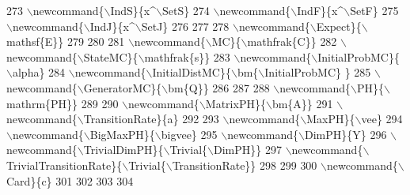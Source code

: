 \begin{DoxyCode}
{}
273 \textcolor{stringliteral}{\(\backslash\)newcommand\{\(\backslash\)IndS\}\{x^\(\backslash\)SetS\}
}
274 \textcolor{stringliteral}{\(\backslash\)newcommand\{\(\backslash\)IndF\}\{x^\(\backslash\)SetF\}
}
275 \textcolor{stringliteral}{\(\backslash\)newcommand\{\(\backslash\)IndJ\}\{x^\(\backslash\)SetJ\}
}
276 \textcolor{stringliteral}{}
277 \textcolor{stringliteral}{%
}
278 \textcolor{stringliteral}{\(\backslash\)newcommand\{\(\backslash\)Expect\}\{\(\backslash\)mathsf\{E\}\}
}
279 \textcolor{stringliteral}{}
280 \textcolor{stringliteral}{%
}
281 \textcolor{stringliteral}{\(\backslash\)newcommand\{\(\backslash\)MC\}\{\(\backslash\)mathfrak\{C\}\}
}
282 \textcolor{stringliteral}{\(\backslash\)newcommand\{\(\backslash\)StateMC\}\{\(\backslash\)mathfrak\{s\}\}
}
283 \textcolor{stringliteral}{\(\backslash\)newcommand\{\(\backslash\)InitialProbMC\}\{\(\backslash\)alpha\}
}
284 \textcolor{stringliteral}{\(\backslash\)newcommand\{\(\backslash\)InitialDistMC\}\{\(\backslash\)bm\{\(\backslash\)InitialProbMC\} \}
}
285 \textcolor{stringliteral}{\(\backslash\)newcommand\{\(\backslash\)GeneratorMC\}\{\(\backslash\)bm\{Q\}\}
}
286 \textcolor{stringliteral}{}
287 \textcolor{stringliteral}{%
}
288 \textcolor{stringliteral}{\(\backslash\)newcommand\{\(\backslash\)PH\}\{\(\backslash\)mathrm\{PH\}\}
}
289 \textcolor{stringliteral}{%
}
290 \textcolor{stringliteral}{\(\backslash\)newcommand\{\(\backslash\)MatrixPH\}\{\(\backslash\)bm\{A\}\}
}
291 \textcolor{stringliteral}{\(\backslash\)newcommand\{\(\backslash\)TransitionRate\}\{a\}
}
292 \textcolor{stringliteral}{%
}
293 \textcolor{stringliteral}{\(\backslash\)newcommand\{\(\backslash\)MaxPH\}\{\(\backslash\)vee\}
}
294 \textcolor{stringliteral}{\(\backslash\)newcommand\{\(\backslash\)BigMaxPH\}\{\(\backslash\)bigvee\}
}
295 \textcolor{stringliteral}{\(\backslash\)newcommand\{\(\backslash\)DimPH\}\{Y\}
}
296 \textcolor{stringliteral}{\(\backslash\)newcommand\{\(\backslash\)TrivialDimPH\}\{\(\backslash\)Trivial\{\(\backslash\)DimPH\}\}
}
297 \textcolor{stringliteral}{\(\backslash\)newcommand\{\(\backslash\)TrivialTransitionRate\}\{\(\backslash\)Trivial\{\(\backslash\)TransitionRate\}\}
}
298 \textcolor{stringliteral}{}
299 \textcolor{stringliteral}{%
}
300 \textcolor{stringliteral}{\(\backslash\)newcommand\{\(\backslash\)Card\}\{c\}
}
301 \textcolor{stringliteral}{}
302 \textcolor{stringliteral}{}
303 \textcolor{stringliteral}{}
304 \textcolor{stringliteral}{%
}
\end{DoxyCode}
